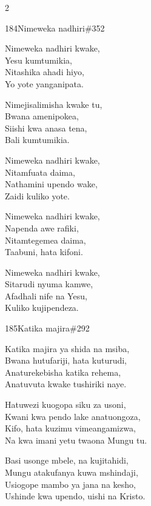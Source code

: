 \begin{multicols}{2}
\begin{hymn}{184}{Nimeweka nadhiri}{\#352}
\begin{stanza}
Nimeweka nadhiri kwake,\\
Yesu kumtumikia,\\
Nitashika ahadi hiyo,\\
Yo yote yanganipata.
\end{stanza}
\begin{chorus}
Nimejisalimisha kwake tu,\\
Bwana amenipokea,\\
Siishi kwa anasa tena,\\
Bali kumtumikia.
\end{chorus}
\begin{stanza}
Nimeweka nadhiri kwake,\\
Nitamfuata daima,\\
Nathamini upendo wake,\\
Zaidi kuliko yote.
\end{stanza}
\begin{stanza}
Nimeweka nadhiri kwake,\\
Napenda awe rafiki,\\
Nitamtegemea daima,\\
Taabuni, hata kifoni.
\end{stanza}
\begin{stanza}
Nimeweka nadhiri kwake,\\
Sitarudi nyuma kamwe,\\
Afadhali nife na Yesu,\\
Kuliko kujipendeza.
\end{stanza}
\end{hymn}

\begin{hymn}{185}{Katika majira}{\#292}
\begin{stanza}
Katika majira ya shida na msiba,\\
Bwana hutufariji, hata kuturudi,\\
Anaturekebisha katika rehema,\\
Anatuvuta kwake tushiriki naye.
\end{stanza}
\begin{stanza}
Hatuwezi kuogopa siku za usoni,\\
Kwani kwa pendo lake anatuongoza,\\
Kifo, hata kuzimu vimeangamizwa,\\
Na kwa imani yetu twaona Mungu tu.
\end{stanza}
\begin{stanza}
Basi usonge mbele, na kujitahidi,\\
Mungu atakufanya kuwa mshindaji,\\
Usiogope mambo ya jana na kesho,\\
Ushinde kwa upendo, uishi na Kristo.
\end{stanza}
\end{hymn}


\end{multicols}
